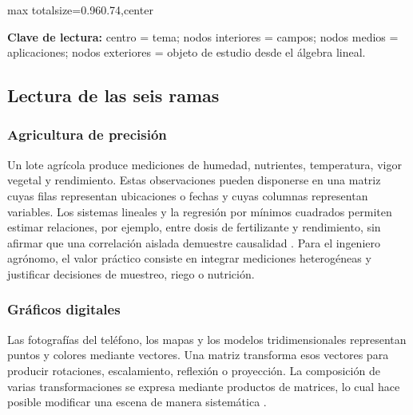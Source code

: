 \documentclass[spanish,letterpaper,oneside]{article}
\begin{document}
\begin{landscape}
\begin{center}
\begin{adjustbox}{max totalsize={0.96\linewidth}{0.74\textheight},center}
\end{adjustbox}
\vspace{0.1cm}

\footnotesize
\textbf{Clave de lectura:} centro = tema; nodos interiores = campos; nodos medios = aplicaciones; nodos exteriores = objeto de estudio desde el álgebra lineal.
\end{center}
\end{landscape}

\subsection{Lectura de las seis ramas}
\subsubsection{Agricultura de precisión}
Un lote agrícola produce mediciones de humedad, nutrientes, temperatura, vigor vegetal y rendimiento. Estas observaciones pueden disponerse en una matriz cuyas filas representan ubicaciones o fechas y cuyas columnas representan variables. Los sistemas lineales y la regresión por mínimos cuadrados permiten estimar relaciones, por ejemplo, entre dosis de fertilizante y rendimiento, sin afirmar que una correlación aislada demuestre causalidad \citep{montgomery2021introduction}. Para el ingeniero agrónomo, el valor práctico consiste en integrar mediciones heterogéneas y justificar decisiones de muestreo, riego o nutrición.

\subsubsection{Gráficos digitales}
Las fotografías del teléfono, los mapas y los modelos tridimensionales representan puntos y colores mediante vectores. Una matriz transforma esos vectores para producir rotaciones, escalamiento, reflexión o proyección. La composición de varias transformaciones se expresa mediante productos de matrices, lo cual hace posible modificar una escena de manera sistemática \citep{gonzalez2018digital}.
\end{document}
